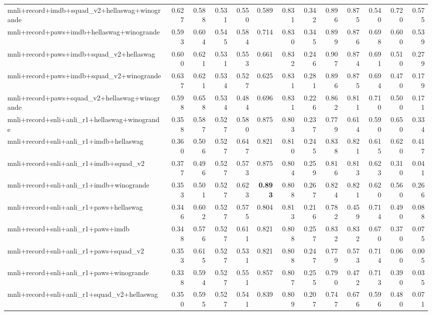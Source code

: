 \begin{table}[t]
\begin{tabular}{lrrrrrrrrrrrr}
    mnli+record+imdb+squad\_v2+hellaswag+winogrande & 0.627 & 0.588 & 0.531 & 0.550 & 0.589 & 0.831 & 0.342 & 0.896 & 0.875 & 0.540 & 0.720 & 0.575 \\
    mnli+record+paws+imdb+hellaswag+winogrande & 0.593 & 0.604 & 0.545 & 0.584 & 0.714 & 0.830 & 0.345 & 0.899 & 0.876 & 0.698 & 0.600 & 0.539 \\
    mnli+record+paws+imdb+squad\_v2+hellaswag & 0.600 & 0.621 & 0.531 & 0.553 & 0.661 & 0.832 & 0.246 & 0.907 & 0.874 & 0.691 & 0.510 & 0.279 \\
    mnli+record+paws+imdb+squad\_v2+winogrande & 0.637 & 0.621 & 0.534 & 0.527 & 0.625 & 0.831 & 0.281 & 0.896 & 0.875 & 0.694 & 0.470 & 0.179 \\
    mnli+record+paws+squad\_v2+hellaswag+winogrande & 0.598 & 0.658 & 0.534 & 0.484 & 0.696 & 0.831 & 0.226 & 0.862 & 0.811 & 0.710 & 0.500 & 0.171 \\
    mnli+record+snli+anli\_r1+hellaswag+winogrande & 0.358 & 0.587 & 0.527 & 0.580 & 0.875 & 0.803 & 0.237 & 0.779 & 0.614 & 0.590 & 0.650 & 0.334 \\
    mnli+record+snli+anli\_r1+imdb+hellaswag & 0.360 & 0.506 & 0.527 & 0.647 & 0.821 & 0.810 & 0.245 & 0.838 & 0.821 & 0.615 & 0.620 & 0.417 \\
    mnli+record+snli+anli\_r1+imdb+squad\_v2 & 0.377 & 0.496 & 0.527 & 0.573 & 0.875 & 0.804 & 0.259 & 0.816 & 0.813 & 0.623 & 0.310 & 0.041 \\
    mnli+record+snli+anli\_r1+imdb+winogrande & 0.353 & 0.501 & 0.527 & 0.623 & \textbf{0.893} & 0.808 & 0.267 & 0.824 & 0.821 & 0.620 & 0.560 & 0.266 \\
    mnli+record+snli+anli\_r1+paws+hellaswag & 0.346 & 0.602 & 0.527 & 0.575 & 0.804 & 0.813 & 0.216 & 0.782 & 0.459 & 0.714 & 0.490 & 0.088 \\
    mnli+record+snli+anli\_r1+paws+imdb & 0.348 & 0.576 & 0.527 & 0.611 & 0.821 & 0.808 & 0.257 & 0.832 & 0.832 & 0.670 & 0.370 & 0.075 \\
    mnli+record+snli+anli\_r1+paws+squad\_v2 & 0.353 & 0.615 & 0.527 & 0.531 & 0.821 & 0.808 & 0.247 & 0.779 & 0.573 & 0.714 & 0.060 & 0.005 \\
    mnli+record+snli+anli\_r1+paws+winogrande & 0.338 & 0.594 & 0.527 & 0.551 & 0.857 & 0.807 & 0.255 & 0.790 & 0.472 & 0.713 & 0.390 & 0.035 \\
    mnli+record+snli+anli\_r1+squad\_v2+hellaswag & 0.350 & 0.595 & 0.527 & 0.541 & 0.839 & 0.809 & 0.207 & 0.747 & 0.676 & 0.596 & 0.480 & 0.071 \\

\end{tabular}
\end{table}
